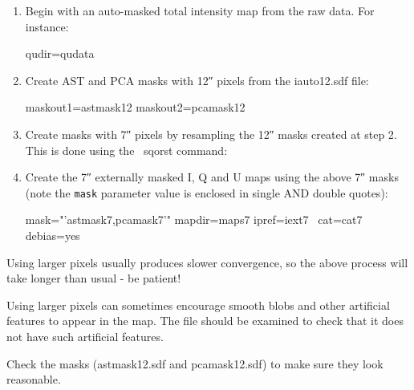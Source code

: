 \begin{enumerate}
\item Begin with an auto-masked total intensity map from the raw
  data. For instance:

\begin{terminalv}
                    qudir=qudata
\end{terminalv}


\item Create AST and PCA masks with 12\si{\arcsecond} pixels from the
  iauto12.sdf file:


\begin{terminalv}
                   maskout1=astmask12 maskout2=pcamask12
\end{terminalv}

\item Create masks with 7\si{\arcsecond} pixels by resampling the
  12\si{\arcsecond} masks created at step 2. This is done using the
  \Kappa\ sqorst command:

\begin{terminalv}
\end{terminalv}

\item Create the 7\si{\arcsecond} externally masked I, Q and U maps
  using the above 7\si{\arcsecond} masks (note the \texttt{mask}
  parameter value is enclosed in single AND double quotes):

\begin{terminalv}
                  mask="'astmask7,pcamask7'" mapdir=maps7 ipref=iext7  \
                  cat=cat7 debias=yes
\end{terminalv}
\end{enumerate}

\begin{tip}
  Using larger pixels usually produces slower convergence, so the
  above process will take longer than usual - be patient!

  Using larger pixels can sometimes encourage smooth blobs and other
  artificial features to appear in the map. The \file{iauto12.sdf} file
  should be examined to check that it does not have such artificial
  features.

  Check the masks (astmask12.sdf and pcamask12.sdf) to make sure they
  look reasonable.
\end{tip}

